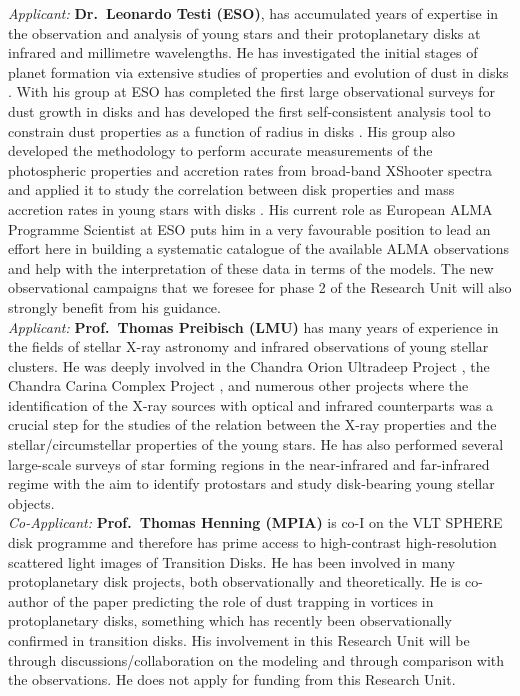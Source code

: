 \documentclass[10pt,fleqn,twoside]{article}
\begin{document}
{\it Applicant:} {\bf Dr.\ Leonardo Testi (ESO)}, has accumulated years of expertise
in the observation and analysis of young stars and their protoplanetary
disks at infrared and millimetre wavelengths. He has investigated the initial stages of planet formation via
extensive studies of properties and evolution of dust in disks 
\citep{2003A&A...403..323T, 2014prpl.conf..339T}. 
With his group at ESO has completed the first large observational surveys for dust growth
in disks \citep{2010A&A...512A..15R, 2010A&A...521A..66R}
and has developed the first self-consistent analysis tool to constrain dust properties
as a function of radius in disks \citep{2011A&A...525A..12B, 2013A&A...558A..64T, 
2016A&A...588A..53T}.
His group also developed the methodology to perform accurate measurements of
the photospheric properties and accretion rates from broad-band XShooter
spectra \citep{2013A&A...551A.107M} and applied it to study the correlation
between disk properties and mass accretion rates in young stars with disks
\citep{2016A&A...591L...3M}.
His current role as European ALMA Programme Scientist at ESO
puts him in a very favourable position to lead an effort here in
building a systematic catalogue of the available ALMA observations and help with the interpretation of these data in terms of
the models. The new observational
campaigns that we foresee for phase 2 of the Research Unit will also
strongly 
benefit from his guidance. \\

{\it Applicant:} {\bf Prof.\ Thomas Preibisch (LMU)}  has many years of experience in the
fields of stellar X-ray astronomy and infrared observations
of young stellar clusters.
He was deeply involved in the
Chandra Orion Ultradeep Project \citep[COUP, see][]{2005ApJS..160..401P},
the Chandra Carina Complex Project \citep[CCCP, see][]{2011ApJS..194...10P},
and numerous other projects where
the identification of the X-ray sources with optical
and infrared counterparts was a crucial step for the studies
of the relation between the X-ray properties and the stellar/circumstellar
properties of the young stars. He has also performed several large-scale 
surveys of star forming
regions in the near-infrared \citep[e.g.,][]{2011ApJS..194...10P,
2014A&A...572A.116P}
and far-infrared regime \citep[e.g.,][]{2012A&A...541A.132P}
with the aim to identify protostars and study disk-bearing young
stellar objects.\\

{\it Co-Applicant:} {\bf Prof.\ Thomas Henning (MPIA)}  is co-I
on the VLT SPHERE disk programme and therefore has prime access to
high-contrast high-resolution scattered light images of Transition
Disks. He has been involved in many protoplanetary disk projects, both
observationally and theoretically. He is co-author of the 
\citet{1997Icar..128..213K} paper predicting the role of dust trapping in vortices
in protoplanetary disks, something which has recently been 
observationally confirmed in transition disks. 
His involvement in this
Research Unit will be through discussions/collaboration on the
modeling and through comparison with the observations. He does not apply for 
funding from this Research Unit.\\
\end{document}
